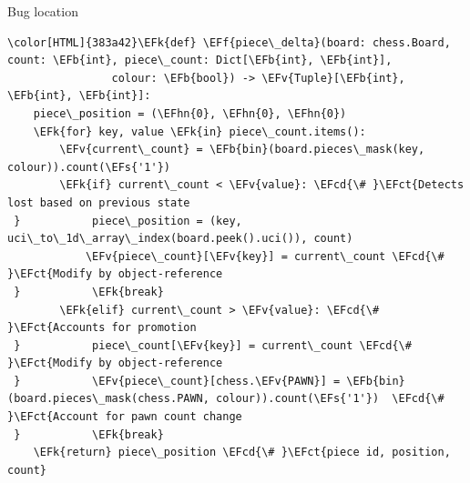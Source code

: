 \documentclass[presentation, 8pt]{beamer}
\newcommand{\EFk}[1]{\textcolor{EFk}{#1}} %
\newcommand{\EFs}[1]{\textcolor{EFs}{#1}} %
\newcommand{\EFb}[1]{\textcolor{EFb}{#1}} %
\newcommand{\EFct}[1]{\textcolor{EFct}{#1}} %
\newcommand{\EFv}[1]{\textcolor{EFv}{#1}} %
\newcommand{\EFf}[1]{\textcolor{EFf}{#1}} %
\newcommand{\EFcd}[1]{\textcolor{EFcd}{#1}} %
\newcommand{\EFhn}[1]{\textcolor{EFhn}{\textbf{#1}}} %
\begin{document}
\begin{frame}[label={sec:org78a0683},fragile]{Bug location}
 \begin{Code}
\begin{Verbatim}[]
\color[HTML]{383a42}\EFk{def} \EFf{piece\_delta}(board: chess.Board, count: \EFb{int}, piece\_count: Dict[\EFb{int}, \EFb{int}],
                colour: \EFb{bool}) -> \EFv{Tuple}[\EFb{int}, \EFb{int}, \EFb{int}]:
    piece\_position = (\EFhn{0}, \EFhn{0}, \EFhn{0})
    \EFk{for} key, value \EFk{in} piece\_count.items():
        \EFv{current\_count} = \EFb{bin}(board.pieces\_mask(key, colour)).count(\EFs{'1'})
        \EFk{if} current\_count < \EFv{value}: \EFcd{\# }\EFct{Detects lost based on previous state
 }           piece\_position = (key, uci\_to\_1d\_array\_index(board.peek().uci()), count)
            \EFv{piece\_count}[\EFv{key}] = current\_count \EFcd{\# }\EFct{Modify by object-reference
 }           \EFk{break}
        \EFk{elif} current\_count > \EFv{value}: \EFcd{\# }\EFct{Accounts for promotion
 }           piece\_count[\EFv{key}] = current\_count \EFcd{\# }\EFct{Modify by object-reference
 }           \EFv{piece\_count}[chess.\EFv{PAWN}] = \EFb{bin}(board.pieces\_mask(chess.PAWN, colour)).count(\EFs{'1'})  \EFcd{\# }\EFct{Account for pawn count change
 }           \EFk{break}
    \EFk{return} piece\_position \EFcd{\# }\EFct{piece id, position, count}
\end{Verbatim}
\end{Code}
\end{frame}
\end{document}
